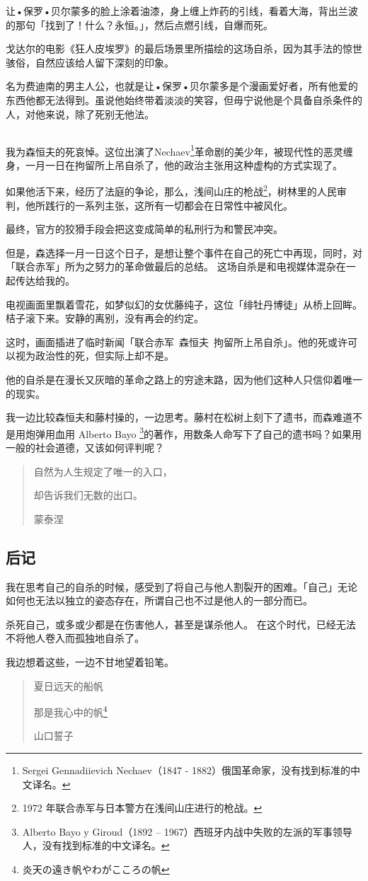 \documentclass[UTF8]{ctexart}
\begin{document}
让•保罗•贝尔蒙多的脸上涂着油漆，身上缠上炸药的引线，看着大海，背出兰波的那句「找到了！什么？永恒。」，然后点燃引线，自爆而死。

戈达尔的电影《狂人皮埃罗》的最后场景里所描绘的这场自杀，因为其手法的惊世骇俗，自然应该给人留下深刻的印象。

名为费迪南的男主人公，也就是让•保罗•贝尔蒙多是个漫画爱好者，所有他爱的东西他都无法得到。虽说他始终带着淡淡的笑容，但毋宁说他是个具备自杀条件的人，对他来说，除了死别无他法。

\subsection{}

我为森恒夫的死哀悼。这位出演了Nechaev\footnote{Sergei Gennadiievich Nechaev（1847 - 1882）俄国革命家，没有找到标准的中文译名。}革命剧的美少年，被现代性的恶灵缠身，一月一日在拘留所上吊自杀了，他的政治主张用这种虚构的方式实现了。

如果他活下来，经历了法庭的争论，那么，浅间山庄的枪战\footnote{1972 年联合赤军与日本警方在浅间山庄进行的枪战。}，树林里的人民审判，他所践行的一系列主张，这所有一切都会在日常性中被风化。

最终，官方的狡猾手段会把这变成简单的私刑行为和警民冲突。

但是，森选择一月一日这个日子，是想让整个事件在自己的死亡中再现，同时，对「联合赤军」所为之努力的革命做最后的总结。
这场自杀是和电视媒体混杂在一起传达给我的。

电视画面里飘着雪花，如梦似幻的女优藤纯子，这位「绯牡丹博徒」从桥上回眸。桔子滚下来。安静的离别，没有再会的约定。

这时，画面插进了临时新闻「联合赤军\ 森恒夫\ 拘留所上吊自杀」。他的死或许可以视为政治性的死，但实际上却不是。

他的自杀是在漫长又灰暗的革命之路上的穷途末路，因为他们这种人只信仰着唯一的现实。

我一边比较森恒夫和藤村操的，一边思考。藤村在松树上刻下了遗书，而森难道不是用炮弹用血用 Alberto Bayo \footnote{Alberto Bayo y Giroud（1892 – 1967）西班牙内战中失败的左派的军事领导人，没有找到标准的中文译名。}的著作，用数条人命写下了自己的遗书吗？如果用一般的社会道德，又该如何评判呢？


\begin{verse}
自然为人生规定了唯一的入口，

却告诉我们无数的出口。

蒙泰涅
\end{verse}

\subsection{后记}

我在思考自己的自杀的时候，感受到了将自己与他人割裂开的困难。「自己」无论如何也无法以独立的姿态存在，所谓自己也不过是他人的一部分而已。

杀死自己，或多或少都是在伤害他人，甚至是谋杀他人。
在这个时代，已经无法不将他人卷入而孤独地自杀了。

我边想着这些，一边不甘地望着铅笔。

\begin{verse}
夏日远天的船帆

那是我心中的帆\footnote{炎天の遠き帆やわがこころの帆}

山口誓子
\end{verse}
\end{document}
